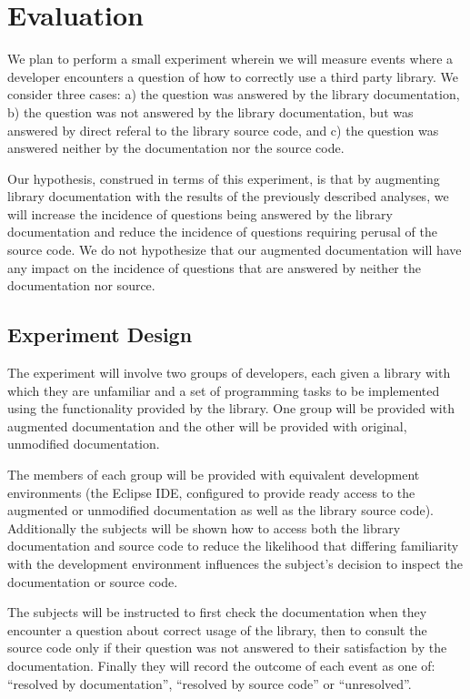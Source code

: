 \section{Evaluation}
\label{sec:Evaluation}

We plan to perform a small experiment wherein we will measure events where a
developer encounters a question of how to correctly use a third party library.
We consider three cases: a) the question was answered by the library
documentation, b) the question was not answered by the library documentation,
but was answered by direct referal to the library source code, and c) the
question was answered neither by the documentation nor the source code.

Our hypothesis, construed in terms of this experiment, is that by augmenting
library documentation with the results of the previously described analyses, we
will increase the incidence of questions being answered by the library
documentation and reduce the incidence of questions requiring perusal of the
source code. We do not hypothesize that our augmented documentation will have
any impact on the incidence of questions that are answered by neither the
documentation nor source.

\subsection{Experiment Design}
The experiment will involve two groups of developers, each given a library with
which they are unfamiliar and a set of programming tasks to be implemented
using the functionality provided by the library. One group will be provided
with augmented documentation and the other will be provided with original,
unmodified documentation.

The members of each group will be provided with equivalent development
environments (the Eclipse IDE, configured to provide ready access to the
augmented or unmodified documentation as well as the library source code).
Additionally the subjects will be shown how to access both the library
documentation and source code to reduce the likelihood that differing
familiarity with the development environment influences the subject's decision
to inspect the documentation or source code.

The subjects will be instructed to first check the documentation when they
encounter a question about correct usage of the library, then to consult the
source code only if their question was not answered to their satisfaction by
the documentation. Finally they will record the outcome of each event as one
of: ``resolved by documentation'', ``resolved by source code'' or
``unresolved''.

